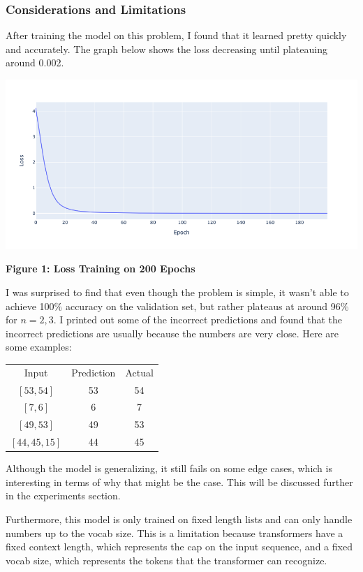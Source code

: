 \documentclass{article}
\begin{document}
\subsubsection{Considerations and Limitations}
After training the model on this problem, I found that it learned pretty quickly and accurately. The graph below shows the loss decreasing until plateauing around 0.002. 
\begin{center}
    \includegraphics[scale=0.4]{fixed_length.png}

    \textbf{Figure 1: Loss Training on 200 Epochs}
\end{center}


I was surprised to find that even though the problem is simple, it wasn't able to achieve 100$\%$ accuracy on the validation set, but rather plateaus at around 96$\%$ for $n = 2, 3$. I printed out some of the incorrect predictions and found that the incorrect predictions are usually because the numbers are very close. Here are some examples:

\begin{center}
    \begin{tabular}{c c c}
        Input & Prediction & Actual \\
        $[53, 54]$ & 53 & 54 \\
        $[7, 6]$ & 6 & 7 \\
        $[49, 53]$ & 49 & 53 \\
        $[44, 45, 15]$ & 44 & 45 \\

    \end{tabular}
\end{center}

Although the model is generalizing, it still fails on some edge cases, which is interesting in terms of why that might be the case. This will be discussed further in the experiments section.

Furthermore, this model is only trained on fixed length lists and can only handle numbers up to the vocab size. This is a limitation because transformers have a fixed context length, which represents the cap on the input sequence, and a fixed vocab size, which represents the tokens that the transformer can recognize. 
\end{document}
